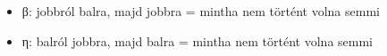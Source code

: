 \begin{itemize}
\item β: jobbról balra, majd jobbra = mintha nem történt volna semmi
\item η: balról jobbra, majd balra = mintha nem történt volna semmi
\end{itemize}
\begin{code}%
%
\>[6]%
\>[12]\AgdaSymbol{:}\AgdaSpace{}%
\AgdaSpace{}%
\AgdaSymbol{\}\{}\AgdaSpace{}%
\AgdaSymbol{:}\AgdaSpace{}%
\AgdaSpace{}%
\AgdaSymbol{\}\{}\AgdaSpace{}%
\AgdaSymbol{:}\AgdaSpace{}%
\AgdaSpace{}%
\AgdaSpace{}%
\AgdaSymbol{\}}\AgdaSpace{}%
\AgdaSpace{}%
\AgdaSpace{}%
\AgdaSpace{}%
\AgdaSymbol{(}\AgdaSpace{}%
\AgdaSpace{}%
\AgdaSymbol{)}\AgdaSpace{}%
\AgdaSpace{}%
\<%
\\
%
\>[6]%
\>[12]\AgdaSymbol{:}\AgdaSpace{}%
\AgdaSpace{}%
\AgdaSymbol{\}\{}\AgdaSpace{}%
\AgdaSymbol{:}\AgdaSpace{}%
\AgdaSpace{}%
\AgdaSymbol{\}\{}\AgdaSpace{}%
\AgdaSymbol{:}\AgdaSpace{}%
\AgdaSpace{}%
\AgdaSpace{}%
\AgdaSymbol{\}}\AgdaSpace{}%
\AgdaSpace{}%
\AgdaSpace{}%
\AgdaOperator{\AgdaField{[}}\AgdaSpace{}%
\AgdaSpace{}%
\AgdaSpace{}%
\AgdaSpace{}%
\AgdaOperator{\AgdaField{]ᵗ}}\AgdaSpace{}%
\AgdaSpace{}%
\<%
\\
%
\>[6]%
\>[12]\AgdaSymbol{:}\AgdaSpace{}%
\AgdaSpace{}%
\AgdaSymbol{\}}\AgdaSpace{}%
\AgdaSpace{}%
\AgdaSymbol{\{}\AgdaSpace{}%
\AgdaSymbol{:}\AgdaSpace{}%
\AgdaSpace{}%
\AgdaSpace{}%
\AgdaSymbol{(}\AgdaSpace{}%
\AgdaSymbol{)\}}\AgdaSpace{}%
\AgdaSpace{}%
\AgdaSpace{}%
\AgdaSpace{}%
\AgdaSymbol{(}\AgdaSpace{}%
\AgdaSpace{}%
\AgdaSpace{}%
\AgdaSpace{}%
\AgdaSpace{}%
\AgdaOperator{\AgdaField{[}}\AgdaSpace{}%
\AgdaSpace{}%
\AgdaOperator{\AgdaField{]ᵗ}}\AgdaSymbol{)}\<%
\end{code}


